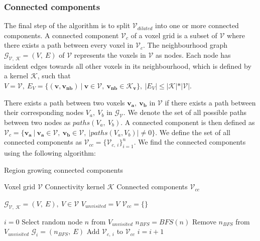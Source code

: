 \subsubsection{Connected components}
The final step of the algorithm is to split \(\mathcal{V}_{dilated}\) into one or more connected components. A connected component \(\mathcal{V}_c\) of a voxel grid is a subset of \(\mathcal{V}\) where there exists a path between every voxel in \(\mathcal{V}_c\). The neighbourhood graph \(\mathcal{G}_{\mathcal{V},\ \mathcal{K}} = (V,\ E)\) of \(\mathcal{V}\) represents the voxels in \(\mathcal{V}\) as nodes. Each node has incident edges towards all other voxels in its neighbourhood, which is defined by a kernel \(\mathcal{K}\), such that \(V = \mathcal{V},\ E_{V} = \{(\boldsymbol{v}, \boldsymbol{v_{nb}})\ |\ \boldsymbol{v} \in \mathcal{V},\ \boldsymbol{v_{nb}} \in \mathcal{K}_{\boldsymbol{v}}\},\ |E_{V}| \leq |\mathcal{K}|*|\mathcal{V}|\). 

There exists a path between two voxels \(\boldsymbol{v_a},\ \boldsymbol{v_b}\) in \(\mathcal{V}\) if there exists a path between their corresponding nodes \(V_a,\ V_b\) in \(\mathcal{G}_{\mathcal{V}}\). We denote the set of all possible paths between two nodes as \(paths(V_a,\ V_b)\). A connected component is then defined as \(\mathcal{V}_c=\{\boldsymbol{v_a}\ |\ \boldsymbol{v_a} \in \mathcal{V},\ \boldsymbol{v_b} \in \mathcal{V},\ |paths(V_a, V_b)| \neq 0\}\). We define the set of all connected components as \(\mathcal{V}_{cc}=\{\mathcal{V}_{c,\ i}\}_{i=1}^n\). We find the connected components using the following algorithm:

\begin{algorithm}
    \caption{Region growing connected components}\label{alg:cap}
    \begin{algorithmic}

    \Require \quad Voxel grid \(\mathcal{V}\)
    \Require \quad Connectivity kernel \(\mathcal{K}\)
    \Ensure \quad Connected components \(\mathcal{V}_{cc}\)

    \State \(\mathcal{G}_{\mathcal{V},\ \mathcal{K}} = (V,\ E),\ V \in \mathcal{V}\) 
    \State \(V_{unvisited} = V\)
    \State \(\mathcal{V}_{cc} = \{\}\)
    
    \State \(i = 0\)
        \State Select random node \(n\) from \(V_{unvisited}\)
        \State \(n_{BFS} = BFS(n)\) 
        \State Remove \(n_{BFS}\) from \(V_{unvisited}\)
        \State \(\mathcal{G}_i = (n_{BFS},\ E)\)
        \State Add \(\mathcal{V}_{c,\ i}\) to \(\mathcal{V}_{cc}\)
        \State \(i = i + 1\)
    \EndWhile
    \end{algorithmic}
\end{algorithm}

